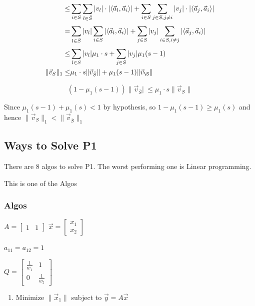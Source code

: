 \documentclass[11pt]{article}
\begin{document}
\begin{equation}
\begin{split}
\leq & \sum_{i \in S}^{} \sum_{l \in \bar S}^{} |v_l| \cdot |\langle \vec a_l, \vec a_i \rangle| + \sum_{i \in S}^{} \sum_{j \in S, j \neq i}^{} |v_j| \cdot |\langle \vec a_j, \vec a_i \rangle| \\
= & \sum_{l \in \bar S}^{} |v_l| \sum_{i \in S}^{} |\langle \vec a_l, \vec a_i \rangle| + \sum_{j \in S}^{} |v_j| \sum_{i \in S, i \neq j}^{} |\langle \vec a_j, \vec a_i \rangle|\\
\leq & \sum_{l \in S}^{} |v_l| \mu_1 \cdot s + \sum_{j \in S}^{} |v_j| \mu_1 (s - 1)\\
\|\vec v_S\|_1 \leq & \mu_1 \cdot s \|\vec v_{\bar S}\| + \mu_1 (s - 1) \|\vec v_\S\|
\end{split}
\end{equation}

$$
(1 - \mu_1 (s - 1)) \|\vec v_{\bar S}|\ \leq \mu_1 \cdot s \|\vec v_S\|
$$


Since \(\mu_1 (s - 1) + \mu_1 (s) < 1\) by hypothesis, so \(1 - \mu_1 (s - 1) \geq
\mu_1 (s)\)  and hence \(\|\vec v_S\|_1 < \|\vec v_{\bar S}\|_1\)

\subsection{Ways to Solve P1}
\label{sec:orgbf16fd3}

There are 8 algos to solve P1. The worst performing one is Linear programming.

This is one of the Algos

\subsubsection{Algos}
\label{sec:org2066710}

\(A = \begin{bmatrix}1 & 1\end{bmatrix}\)
\(\vec x = \begin{bmatrix} x_1\\ x_2 \end{bmatrix}\)

\(a_{11} = a_{12} = 1\)

\(Q = \begin{bmatrix} \frac{1}{w_1} & 1\\ 0 & \frac{1}{w_2}\end{bmatrix}\)
\begin{enumerate}
\item Minimize \(\|\vec x_1\|\) subject to \(\vec y = A \vec x\)
\end{enumerate}
\end{document}

